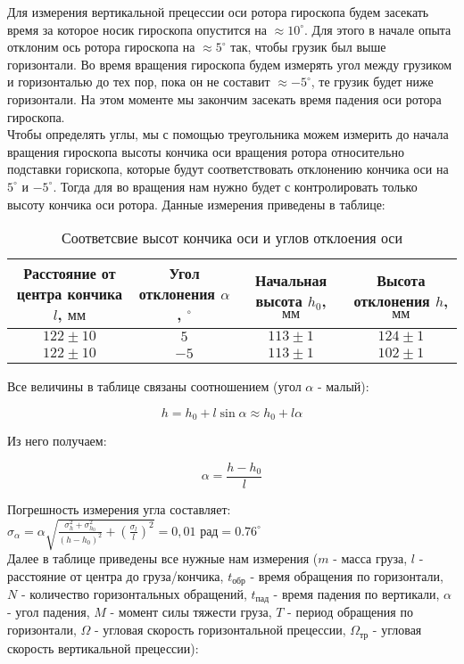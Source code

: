\documentclass[a4paper]{article}
\begin{document}
Для измерения вертикальной прецессии оси ротора гироскопа будем засекать время за которое носик гироскопа опустится на $\approx 10^\circ$. Для этого в начале опыта отклоним ось ротора гироскопа на $\approx 5^\circ$ так, чтобы грузик был выше горизонтали. Во время вращения гироскопа будем измерять угол между грузиком и горизонталью до тех пор, пока он не составит $\approx -5^\circ$, те грузик будет ниже горизонтали. На этом моменте мы закончим засекать время падения оси ротора гироскопа. \\

Чтобы определять углы, мы с помощью треугольника можем измерить до начала вращения гироскопа высоты кончика оси вращения ротора относительно подставки горископа, которые будут соответствовать отклонению кончика оси на $5^\circ$ и $-5^\circ$. Тогда для во вращения нам нужно будет с контролировать только высоту кончика оси ротора. Данные измерения приведены в таблице:

\begin{table}[h!]
\centering
\caption{Соответсвие высот кончика оси и углов отклоения оси}
\begin{tabular}{|c|c|c|c|}
\hline
Расстояние от центра кончика $l$, $\text{мм}$ & Угол отклонения $\alpha$, $^\circ$ & Начальная высота $h_0$, $\text{мм}$ & Высота отклонения $h$, $\text{мм}$  \\ \hline
$122\pm{10}$  & $5$  & $113\pm{1}$ &  $124\pm{1}$\\ \hline
$122\pm{10}$  & $-5$ & $113\pm{1}$ &  $102\pm{1}$\\ \hline
\end{tabular}
\end{table}

Все величины в таблице связаны соотношением (угол $\alpha$ - малый):

\begin{equation}
	h = h_0 + l\sin{\alpha} \approx h_0 + l\alpha
\end{equation}

Из него получаем:

\begin{equation}
	\alpha = \frac{h - h_0}{l}
\end{equation}

\item Погрешность измерения угла составляет: $\sigma_\alpha = \alpha \sqrt{\frac{\sigma_h^2 + \sigma_{h_0}^2}{(h - h_0)^2} + (\frac{\sigma_l}{l})^2} = 0,01\text{ рад} = 0.76^\circ$\\

Далее в таблице приведены все нужные нам измерения ($m$ - масса груза, $l$ - расстояние от центра до груза/кончика, $t_\text{обр}$ - время обращения по горизонтали, $N$ - количество горизонтальных обращений, $t_\text{пад}$ - время падения по вертикали, $\alpha$ - угол падения, $M$ - момент силы тяжести груза, $T$ - период обращения по горизонтали, $\Omega$ - угловая скорость горизонтальной прецессии, $\Omega_\text{тр}$ - угловая скорость вертикальной прецессии):
\end{document}
